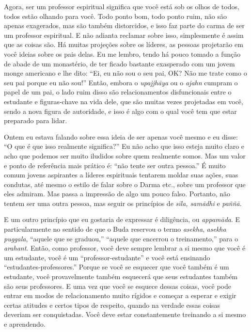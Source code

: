 Agora, ser um professor espiritual significa que você está sob os
olhos de todos, todos estão olhando para você. Todo ponto bom, todo
ponto ruim, não são apenas exagerados, mas são também distorcidos, e
isso faz parte do carma de ser um professor espiritual. E não adianta
reclamar sobre isso, simplesmente é assim que as coisas são. Há muitas
projeções sobre os líderes, as pessoas projetarão em você ideias sobre
os pais delas. Eu me lembro, tendo há pouco tomado a função de abade de
um monastério, de ter ficado bastante exasperado com um jovem monge
americano e lhe dito: “Ei, eu não sou o seu pai, OK? Não me trate como
o seu pai porque eu não sou!” Então, embora o \emph{upajjhāya} ou o
\emph{ajahn} cumpram o papel de um pai, o lado ruim disso são
relacionamentos disfuncionais entre o estudante e figuras-chave na vida
dele, que são muitas vezes projetadas em você, sendo a nova figura de
autoridade, e isso é algo com o qual você tem que estar preparado para
lidar. 

Ontem eu estava falando sobre essa ideia de ser apenas você mesmo e
eu disse: “O que é que isso realmente significa?” Eu não acho que isso
esteja muito claro e acho que podemos ser muito iludidos sobre quem
realmente somos. Mas um valor e ponto de referência mais prático é:
“não tente ser outra pessoa.” É muito comum jovens aspirantes a líderes
espirituais tentarem moldar suas ações, suas condutas, até mesmo o
estilo de falar sobre o Darma etc., sobre um professor que eles
admiram. Mas passa a impressão de algo um pouco falso. Portanto, não
tentem ser uma outra pessoa, mas seguir os princípios de
\emph{sīla, samādhi} e \emph{paññā}. 

E um outro princípio que eu gostaria de expressar é diligência, ou
\emph{appamāda}. E particularmente no sentido de que o Buda
reservou o termo \emph{asekha}, \emph{asekha puggala}, “aquele que
se graduou,” “aquele que encerrou o treinamento,” para o
\emph{arahant}. Então, como professor, você deve sempre lembrar a si
mesmo que você é um estudante, você é um “professor-estudante” e você
está ensinando “estudantes-professores.” Porque se você se esquecer que
você também é um estudante, você provavelmente também esquecerá que
seus estudantes também são seus professores. E uma vez que você se
esquece dessas coisas, você pode entrar em modos de relacionamento
muito rígidos e começar a esperar e exigir certas atitudes e certos
tipos de respeito, quando na verdade essas coisas deveriam ser
conquistadas. Você deve estar constantemente treinando a si mesmo e
aprendendo. 

